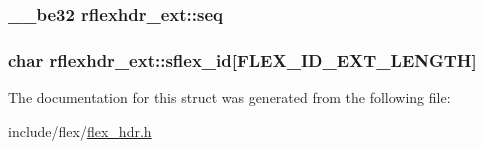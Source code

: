 \subsubsection[{\texorpdfstring{seq}{seq}}]{\setlength{\rightskip}{0pt plus 5cm}\+\_\+\+\_\+be32 rflexhdr\+\_\+ext\+::seq}\hypertarget{structrflexhdr__ext_a240fcbc0eff91a233304845f516d75d8}{}\label{structrflexhdr__ext_a240fcbc0eff91a233304845f516d75d8}
\subsubsection[{\texorpdfstring{sflex\+\_\+id}{sflex_id}}]{\setlength{\rightskip}{0pt plus 5cm}char rflexhdr\+\_\+ext\+::sflex\+\_\+id\mbox{[}{\bf F\+L\+E\+X\+\_\+\+I\+D\+\_\+\+E\+X\+T\+\_\+\+L\+E\+N\+G\+TH}\mbox{]}}\hypertarget{structrflexhdr__ext_aba2b1333b35892ce3ae9c75dd8e2a521}{}\label{structrflexhdr__ext_aba2b1333b35892ce3ae9c75dd8e2a521}


The documentation for this struct was generated from the following file\+:\begin{DoxyCompactItemize}
\item 
include/flex/\hyperlink{flex__hdr_8h}{flex\+\_\+hdr.\+h}\end{DoxyCompactItemize}
